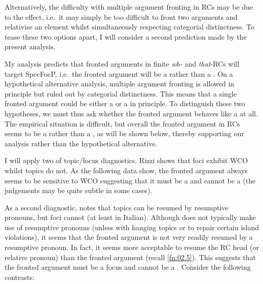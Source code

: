 \documentclass[output=paper]{langsci/langscibook}
\begin{document}
\label{ex:key:2.84}
\z
Alternatively, the difficulty with multiple argument fronting in
\glspl{RC} may be due to the 
effect, i.e.\ it may simply be too difficult to front two arguments and
relativise an element whilst simultaneously respecting categorial distinctness.
To tease these two options apart, I will consider a second prediction made by
the present analysis.

My analysis predicts that fronted arguments in finite \emph{wh-} and
\emph{that}-\glspl{RC} will target SpecFocP, i.e.\ the fronted argument will be a
 rather than a . On a hypothetical alternative analysis, multiple
argument fronting is allowed in principle but ruled out by categorial
distinctness. This means that a single fronted argument could be either a 
or a  in principle. To distinguish these two hypotheses, we must thus ask
whether the fronted argument behaves like a  at all. The empirical
situation is difficult, but overall the fronted argument in \glspl{RC} seems to be a
 rather than a , as will be shown below, thereby supporting our
analysis rather than the hypothetical alternative.

I will apply two of  topic/focus diagnostics. Rizzi shows
that foci exhibit \gls{WCO} whilst topics do not. As the following data show,
the fronted argument always seems to be sensitive to
\gls{WCO} suggesting that it must be a  and cannot be a  (the
judgements may be quite subtle in some cases).

\ea\label{ex:key:2.85}
    \z
\z
\ea\label{ex:key:2.86}
    \z
\z
As a second diagnostic, \textcite{Rizzi1997} notes that topics can be resumed by
resumptive pronouns, but foci cannot (at least in Italian). Although 
does not typically make use of resumptive pronouns (unless with hanging topics
or to repair certain island violations), it seems that the fronted argument is
not very readily resumed by a resumptive pronoun. In fact, it seems more
acceptable to resume the \gls{RC} head (or relative pronoun) than the fronted
argument (recall \cref{fn:02.5}). This suggests that the fronted argument must be a
focus and cannot be a . Consider the following contrasts:
\end{document}
